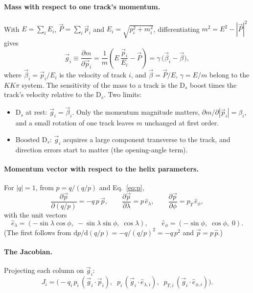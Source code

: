 \documentclass[11pt,a4paper]{article}
\newcommand{\qp}{(q/p)}
\newcommand{\vb}[1]{\vec{#1}}
\begin{document}
\paragraph{Mass with respect to one track's momentum.} With $E=\sum_i E_i$, $\vb P = \sum_i \vb p_i$ and
$E_i = \sqrt{p_i^2+m_i^2}$, differentiating $m^2 = E^2 - |\vb P|^2$ gives
\begin{equation}
  \vb g_i \equiv \frac{\partial m}{\partial \vb p_i}
  = \frac{1}{m}\left( E\,\frac{\vb p_i}{E_i} - \vb P \right)
  = \gamma\,\big( \vb\beta_i - \vb\beta \big),
  \label{eq:g}
\end{equation}
where $\vb\beta_i = \vb p_i/E_i$ is the velocity of track $i$, and $\vb\beta=\vb P/E$, $\gamma = E/m$ belong
to the $KK\pi$ system. The sensitivity of the mass to a track is the D$_s$ boost times the track's velocity
relative to the D$_s$. Two limits:
\begin{itemize}
  \item D$_s$ at rest: $\vb g_i = \vb\beta_i$. Only the momentum magnitude matters,
        $\partial m/\partial |\vb p_i| = \beta_i$, and a small rotation of one track leaves $m$ unchanged at
        first order.
  \item Boosted D$_s$: $\vb g_i$ acquires a large component transverse to the track, and direction errors
        start to matter (the opening-angle term).
\end{itemize}

\paragraph{Momentum vector with respect to the helix parameters.} For $|q|=1$, from $p = q/\qp$ and
Eq.~\eqref{eq:p},
\begin{equation}
  \frac{\partial \vb p}{\partial \qp} = -q\,p\,\vb p, \qquad
  \frac{\partial \vb p}{\partial \lambda} = p\,\hat e_\lambda, \qquad
  \frac{\partial \vb p}{\partial \phi} = p_T\,\hat e_\phi,
\end{equation}
with the unit vectors
\begin{equation}
  \hat e_\lambda = (-\sin\lambda\cos\phi,\; -\sin\lambda\sin\phi,\; \cos\lambda), \qquad
  \hat e_\phi = (-\sin\phi,\; \cos\phi,\; 0).
\end{equation}
(The first follows from $\mathrm{d}p/\mathrm{d}\qp = -q/\qp^2 = -q\,p^2$ and $\vb p = p\,\hat p$.)

\paragraph{The Jacobian.} Projecting each column on $\vb g_i$:
\begin{equation}
  J_i = \Big( -q_i\,p_i\,(\vb g_i\cdot\vb p_i),\;\; p_i\,(\vb g_i\cdot\hat e_{\lambda,i}),\;\;
              p_{T,i}\,(\vb g_i\cdot\hat e_{\phi,i}) \Big).
  \label{eq:J}
\end{equation}
\end{document}
